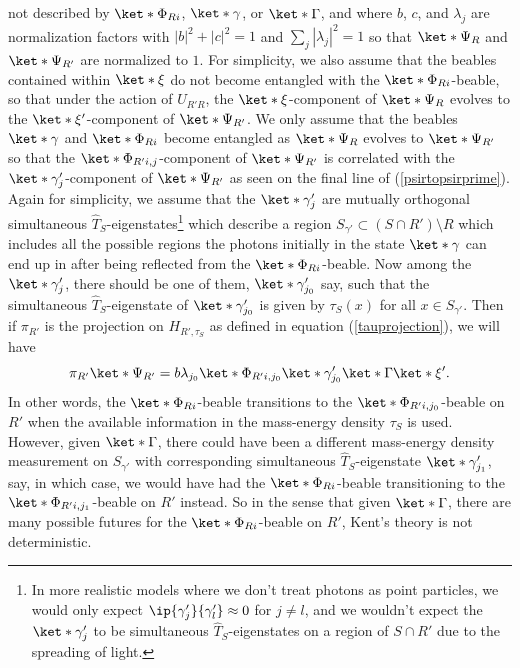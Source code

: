 \documentclass[12pt]{report}
\begin{document}
not described by $\ket*{\Phi_{Ri}}$, $\ket*{\gamma}$, or $\ket*{\Gamma}$, and where $b$, $c$, and $\lambda_j$ are normalization factors with $|b|^2+|c|^2=1$ and $\sum_j |\lambda_j|^2=1$ so that $\ket*{\Psi_{R}}$ and $\ket*{\Psi_{R'}}$ are normalized to $1$. 
For simplicity, we also assume that the beables contained within $\ket*{\xi}$ do not become entangled with the $\ket*{\Phi_{Ri}}$-beable, so that under the action of $U_{R'R}$, the $\ket*{\xi}$-component of $\ket*{\Psi_{R}}$ evolves to the $\ket*{\xi'}$-component of $\ket*{\Psi_{R'}}$. We only assume that the beables $\ket*{\gamma}$ and $\ket*{\Phi_{Ri}}$ become entangled as $\ket*{\Psi_{R}}$ evolves to $\ket*{\Psi_{R'}}$ so that the $\ket*{\Phi_{R'i, j}}$-component of $\ket*{\Psi_{R'}}$ is correlated with the $\ket*{\gamma_{j}'}$-component of $\ket*{\Psi_{R'}}$ as seen on the final line of (\ref{psirtopsirprime}). Again for simplicity, we assume that the $\ket*{\gamma_{j}'}$ are mutually orthogonal simultaneous $\hat{T}_S$-eigenstates\footnote{In more realistic models where we don't treat photons as point particles, we would only expect $\ip{\gamma_{j}'}{\gamma_{l}'}\approx 0$ for $j\neq l$, and we wouldn't expect the $\ket*{\gamma_{j}'}$ to be simultaneous $\hat{T}_S$-eigenstates on a region of $S\cap R'$  due to the spreading of light.} which  describe a region  $S_{\gamma'}\subset(S\cap R')\setminus R$ which includes all the possible regions the photons initially in the state $\ket*{\gamma}$ can end up in after being reflected from the $\ket*{\Phi_{Ri}}$-beable. Now among the $\ket*{\gamma_{j}'}$, there should be one of them, $\ket*{\gamma_{j_0}'}$ say, such that the simultaneous $\hat{T}_S$-eigenstate of $\ket*{\gamma_{j_0}'}$ is given by $\tau_S(x)$ for all $x\in S_{\gamma'}$. Then if $\pi_{R'}$ is the projection on $H_{R',\tau_S}$ as defined in equation (\ref{tauprojection}), we will have 
$$\pi_{R'}\ket*{\Psi_{R'}}=b\lambda_{j_0}\ket*{\Phi_{R'i,j_0}}\ket*{\gamma_{j_0}'}\ket*{\Gamma}\ket*{\xi'}.$$
In other words, the $\ket*{\Phi_{Ri}}$-beable transitions to the $\ket*{\Phi_{R'i,j_0}}$-beable on $R'$ when the available information in the mass-energy density $\tau_S$ is used. However, given $\ket*{\Gamma}$, there could have been a different mass-energy density measurement on $S_{\gamma'}$ with corresponding simultaneous $\hat{T}_S$-eigenstate $\ket*{\gamma_{j_1}'}$, say, in which case, we would have had the $\ket*{\Phi_{Ri}}$-beable transitioning to the $\ket*{\Phi_{R'i,j_1}}$-beable on $R'$ instead.
So in the sense that given $\ket*{\Gamma}$, there are many possible futures for the $\ket*{\Phi_{Ri}}$-beable on $R'$,  Kent's theory is not deterministic.
\end{document}
